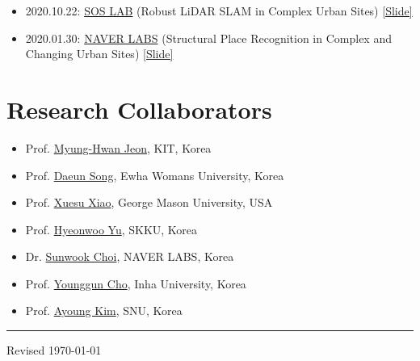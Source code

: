 \documentclass{cv} %
\begin{document}
\begin{itemize}[label=$\cdot$]
    \item 2020.10.22: \href{http://soslab.co/}{SOS LAB} (Robust LiDAR SLAM in Complex Urban Sites) \href{https://www.dropbox.com/s/p30dpjqjbjhq69x/20201022\%20SOSLAB\%20talk\%20Giseop\%20Kim\%20share.pdf?dl=0}{[Slide]}

    \item 2020.01.30: \href{https://www.naverlabs.com/}{NAVER LABS} (Structural Place Recognition in Complex and Changing Urban Sites) \href{https://www.google.com/url?q=https\%3A\%2F\%2Fwww.dropbox.com\%2Fs\%2Fcoul2elzlulbj1j\%2FStructural\%2520Place\%2520Recognition\%2520in\%2520Complex\%2520and\%2520Changing\%2520Urban\%2520Sites.pptx\%3Fdl\%3D0&sa=D&sntz=1&usg=AFQjCNF6McgylrY6kU5KmqvCLC6_n-TzIw}{[Slide]}
\end{itemize}

\section{Research Collaborators}

\begin{itemize}[label=$\cdot$]
    \item Prof. \href{}{Myung-Hwan Jeon}, KIT, Korea
    \item Prof. \href{}{Daeun Song}, Ewha Womans University, Korea
    \item Prof. \href{}{Xuesu Xiao}, George Mason University, USA
    \item Prof. \href{}{Hyeonwoo Yu}, SKKU, Korea
    \item Dr. \href{}{Sunwook Choi}, NAVER LABS, Korea
    \item Prof. \href{}{Younggun Cho}, Inha University, Korea
    \item Prof. \href{https://ayoungk.github.io}{Ayoung Kim}, SNU, Korea
\end{itemize}



\noindent\rule{\textwidth}{0.4pt}
\vspace{1mm}
\hfill Revised \today
\end{document}
